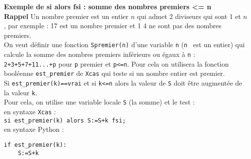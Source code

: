 \documentclass[12pt,a4paper]{book}
\begin{document}
\begin{giacjshere}
{\bf Exemple de si alors fsi : somme des nombres premiers <= n}\\
{\bf Rappel} Un nombre premier est un entier $n$ qui admet 2 diviseurs qui sont
1 et $n$, par exemple : 17 est un nombre premier et 1 4 ne sont pas des nombres 
premiers.\\ 
On veut d\'efinir une fonction {\tt Spremier(n)} d'une variable {\tt n} 
({\tt n } est un  entier) qui calcule la somme des nombres premiers inf\'erieurs
 ou \'egaux \`a {\tt n} : {\tt 2+3+5+7+11...+p} pour {\tt p} premier et 
{\tt p<=n}. Pour cela on utilisera la fonction bool\'eenne {\tt est\_premier}
de {\tt Xcas} qui teste si un nombre entier est premier.\\
Si {\tt est\_premier(k)==vrai} et si {\tt k<=n} alors la valeur de {\tt S} doit 
\^etre augment\'ee  de la valeur {\tt k}.\\
Pour cela, on utilise une variable locale {\tt S} (la somme) et le test :\\
en syntaxe {\tt Xcas} :\\
{\tt si est\_premier(k) alors S:=S+k fsi;}\\
en syntaxe Python :\\
\begin{verbatim}
if est_premier(k): 
    S:=S+k
\end{verbatim}


\end{giacjshere}
\end{document}
